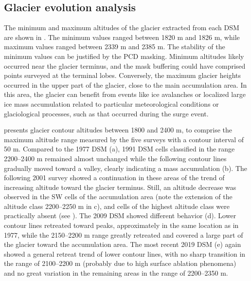 \subsection{Glacier evolution analysis}\label{sec:2:res_glacier_evolution}

The minimum and maximum altitudes of the glacier extracted from each DSM are shown in .
The minimum values ranged between 1820 m and 1826 m, while maximum values ranged between 2339 m and 2385 m. 
The stability of the minimum values can be justified by the PCD masking. 
Minimum altitudes likely occurred near the glacier terminus, and the mask buffering could have comprised points surveyed at the terminal lobes.
Conversely, the maximum glacier heights occurred in the upper part of the glacier, close to the main accumulation area.
In this area, the glacier can benefit from events like ice avalanches or localized large ice mass accumulation related to particular meteorological conditions or glaciological processes, such as that occurred during the surge event.

 presents glacier contour altitudes between 1800 and 2400 m, to comprise the maximum altitude range measured by the five surveys with a contour interval of 50 m.
Compared to the 1977 DSM (a), 1991 DSM cells classified in the range 2200–2400 m remained almost unchanged while the following contour lines gradually moved toward a valley, clearly indicating a mass accumulation (b).
The following 2001 survey showed a continuation in these areas of the trend of increasing altitude toward the glacier terminus. 
Still, an altitude decrease was observed in the SW cells of the accumulation area (note the extension of the altitude class 2200–2250 m in c), and cells of the highest altitude class were practically absent (see ). 
The 2009 DSM showed different behavior (d). 
Lower contour lines retreated toward peaks, approximately in the same location as in 1977, while the 2150–2200 m range greatly retreated and covered a large part of the glacier toward the accumulation area.
The most recent 2019 DSM (e) again showed a general retreat trend of lower contour lines, with no sharp transition in the range of 2100–2200 m (probably due to high surface ablation phenomena) and no great variation in the remaining areas in the range of 2200–2350 m.

